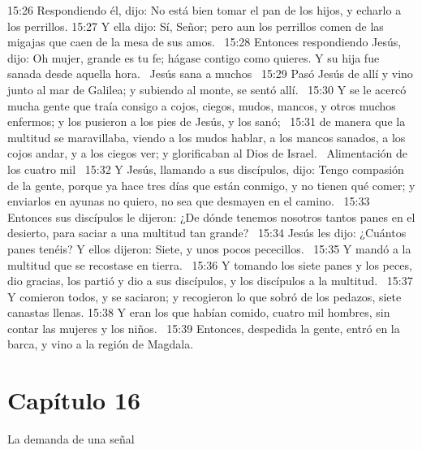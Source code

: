 15:26 Respondiendo él, dijo: No está bien tomar el pan de los hijos, y echarlo a los perrillos. 
15:27 Y ella dijo: Sí, Señor; pero aun los perrillos comen de las migajas que caen de la mesa de sus amos.  
15:28 Entonces respondiendo Jesús, dijo: Oh mujer, grande es tu fe; hágase contigo como quieres. Y su hija fue sanada desde aquella hora.  
Jesús sana a muchos  
15:29 Pasó Jesús de allí y vino junto al mar de Galilea; y subiendo al monte, se sentó allí.  
15:30 Y se le acercó mucha gente que traía consigo a cojos, ciegos, mudos, mancos, y otros muchos enfermos; y los pusieron a los pies de Jesús, y los sanó;  
15:31 de manera que la multitud se maravillaba, viendo a los mudos hablar, a los mancos sanados, a los cojos andar, y a los ciegos ver; y glorificaban al Dios de Israel.  
Alimentación de los cuatro mil   
15:32 Y Jesús, llamando a sus discípulos, dijo: Tengo compasión de la gente, porque ya hace tres días que están conmigo, y no tienen qué comer; y enviarlos en ayunas no quiero, no sea que desmayen en el camino.  
15:33 Entonces sus discípulos le dijeron: ¿De dónde tenemos nosotros tantos panes en el desierto, para saciar a una multitud tan grande?  
15:34 Jesús les dijo: ¿Cuántos panes tenéis? Y ellos dijeron: Siete, y unos pocos pececillos.  
15:35 Y mandó a la multitud que se recostase en tierra.  
15:36 Y tomando los siete panes y los peces, dio gracias, los partió y dio a sus discípulos, y los discípulos a la multitud.  
15:37 Y comieron todos, y se saciaron; y recogieron lo que sobró de los pedazos, siete canastas llenas. 
15:38 Y eran los que habían comido, cuatro mil hombres, sin contar las mujeres y los niños.  
15:39 Entonces, despedida la gente, entró en la barca, y vino a la región de Magdala.  
\section*{Capítulo 16}
La demanda de una señal   

